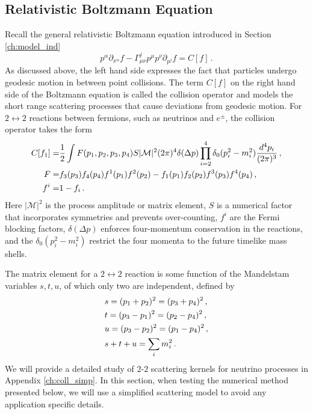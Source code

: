 \subsection{Relativistic Boltzmann Equation }\label{boltzmann_basics}

Recall the general relativistic Boltzmann equation introduced in Section \ref{ch:model_ind}
\begin{equation}\label{boltzmann}
p^\alpha\partial_{x^\alpha}f-\Gamma^j_{\mu\nu}p^\mu p^\nu\partial_{p^j}f=C[f]\,.
\end{equation}
As discussed above, the left hand side expresses the fact that particles undergo geodesic motion in between point collisions. The term $C[f]$ on the right hand side of the Boltzmann equation is called the collision operator and models the short range scattering processes that cause deviations from geodesic motion. For $2\leftrightarrow 2$ reactions between fermions, such as neutrinos and $e^\pm$, the collision operator takes the form
\begin{align}\label{coll}
C[f_1]=&\frac{1}{2}\int F(p_1,p_2,p_3,p_4) S |\mathcal{M}|^2(2\pi)^4\delta(\Delta p)\prod_{i=2}^4\delta_0(p_i^2-m_i^2)\frac{d^4p_i}{(2\pi)^3}\,,\\
F=&f_3(p_3)f_4(p_4)f^1(p_1)f^2(p_2)-f_1(p_1)f_2(p_2)f^3(p_3)f^4(p_4)\,,\notag\\
f^i=&1- f_i\,.\notag
\end{align}
Here $|\mathcal{M}|^2$ is the process amplitude or matrix element, $S$ is a numerical factor that incorporates symmetries and prevents over-counting, $f^i$ are the Fermi blocking factors, $\delta(\Delta p)$ enforces four-momentum conservation in the reactions, and the $\delta_0(p_i^2-m_i^2)$ restrict the four momenta to the future timelike mass shells.


The matrix element for a $2\leftrightarrow2$ reaction is some function of the Mandelstam variables $s, t, u$, of which only two are independent, defined by 
\begin{align}\label{Mandelstam}
&s=(p_1+p_2)^2=(p_3+p_4)^2\,,\\
&t=(p_3-p_1)^2=(p_2-p_4)^2\,,\notag\\
&u=(p_3-p_2)^2=(p_1-p_4)^2\,,\notag\\
&s+t+u=\sum_i m_i^2\,.\notag
\end{align}
We will provide a detailed study of $2$-$2$ scattering kernels for neutrino processes in Appendix \ref{ch:coll_simp}.  In this section, when testing the numerical method presented below, we will use a simplified scattering model to avoid any application specific details.

